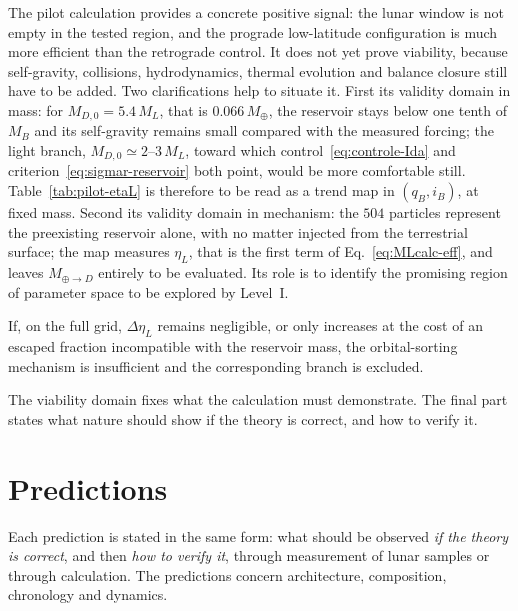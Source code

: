 \documentclass[11pt,a4paper,openany]{report}
\newcommand{\Mt}{M_{\oplus}}
\begin{document}
\begin{controle}
The pilot calculation provides a concrete positive signal: the lunar window is not empty in the
tested region, and the prograde low-latitude configuration is much more efficient than the
retrograde control. It does not yet prove viability, because self-gravity, collisions,
hydrodynamics, thermal evolution and balance closure still have to be added. Two clarifications
help to situate it. First its validity domain in mass: for $M_{D,0}=5.4\,M_L$, that is
$0.066\,\Mt$, the reservoir stays below one tenth of $M_B$ and its self-gravity remains small
compared with the measured forcing; the light branch, $M_{D,0}\simeq2$--$3\,M_L$, toward which
control~\eqref{eq:controle-Ida} and criterion~\eqref{eq:sigmar-reservoir} both point, would be more
comfortable still. Table~\ref{tab:pilot-etaL} is therefore to be read
as a trend map in $(q_B,i_B)$, at fixed mass. Second its validity domain in mechanism: the $504$
particles represent the preexisting reservoir alone, with no matter injected from the terrestrial
surface; the map measures $\eta_L$, that is the first term of Eq.~\eqref{eq:MLcalc-eff}, and leaves
$M_{\oplus\to D}$ entirely to be evaluated. Its role is to identify
the promising region of parameter space to be explored by Level~I.
\end{controle}

\begin{falsif}
If, on the full grid, $\Delta\eta_L$ remains negligible, or only increases at the cost of an escaped
fraction incompatible with the reservoir mass, the orbital-sorting mechanism is insufficient and
the corresponding branch is excluded.
\end{falsif}

\begin{rappel}
The viability domain fixes what the calculation must demonstrate. The final part states what
nature should show if the theory is correct, and how to verify it.
\end{rappel}

\part{Predictions}
\label{part:predictions}

\noindent
Each prediction is stated in the same form: what should be observed \emph{if the theory is correct},
and then \emph{how to verify it}, through measurement of lunar samples or through calculation. The
predictions concern architecture, composition, chronology and dynamics.
\end{document}
